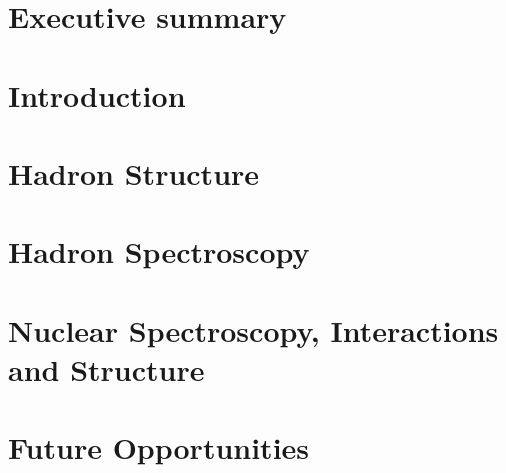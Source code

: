 \maketitle


\section*{Executive summary}


\section{Introduction}
\label{sec:intro}


\section{Hadron Structure}
\label{sec:hadronstructure}


\section{Hadron Spectroscopy}
\label{sec:hadronspectroscopy}


\section{Nuclear Spectroscopy, Interactions and Structure}
\label{sec:nuclear}


\section{Future Opportunities}
\label{sec:future}


\begin{figure}
    \vspace*{3cm}
\end{figure}





